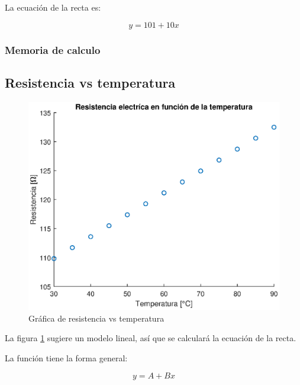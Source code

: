 \documentclass[letter,11pt]{article}
\begin{document}
La ecuación de la recta es:

\begin{equation}
    y = 101 + 10 x
\end{equation}

\subsubsection{Memoria de calculo}

\begin{alltt}
\footnotesize

\normalsize
\end{alltt}

\subsection{Resistencia vs temperatura}
\begin{figure}[!h]
\centering
\includegraphics[scale=1.00]{eps/3.3.1.eps}
\caption{Gráfica de resistencia vs temperatura}
\label{practica33}
\end{figure}

La figura \ref{practica33} sugiere un modelo lineal, así que se calculará la
ecuación de la recta.

La función tiene la forma general:

\begin{equation}
    y = A + B x
\end{equation}
\end{document}
